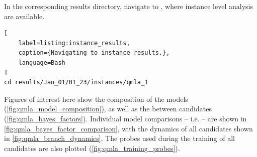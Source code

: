 \par 

In the corresponding results directory, navigate to , where instance level analysis are available. 

\begin{lstlisting}[
    label=listing:instance_results,
    caption={Navigating to instance results.},
    language=Bash
]
cd results/Jan_01/01_23/instances/qmla_1
\end{lstlisting}

Figures of interest here show the composition of the models (\cref{fig:qmla_model_composition}), 
    as well as the  between candidates (\cref{fig:qmla_bayes_factors}). 
Individual model comparisons -- i.e.  -- 
    are shown in \cref{fig:qmla_bayes_factor_comparison}, 
    with the dynamics of all candidates shown in \cref{fig:qmla_branch_dynamics}. 
The probes used during the training of all candidates are also plotted  (\cref{fig:qmla_training_probes}).

